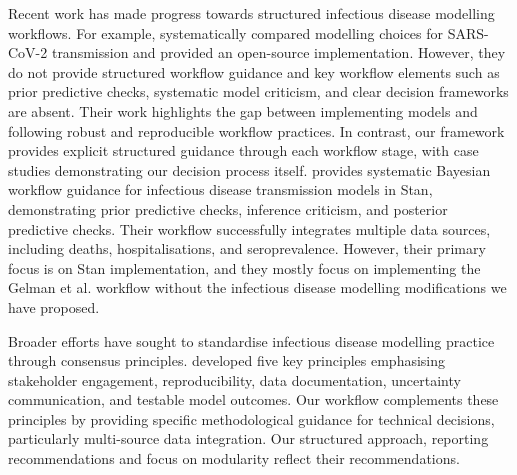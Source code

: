 \documentclass{article}
\begin{document}
Recent work has made progress towards structured infectious disease modelling workflows.
For example, \citet{bouman2024bayesian} systematically compared modelling choices for SARS-CoV-2 transmission and provided an open-source implementation.
However, they do not provide structured workflow guidance and key workflow elements such as prior predictive checks, systematic model criticism, and clear decision frameworks are absent.
Their work highlights the gap between implementing models and following robust and reproducible workflow practices.
In contrast, our framework provides explicit structured guidance through each workflow stage, with case studies demonstrating our decision process itself.
\citet{grinsztajn2021bayesian} provides systematic Bayesian workflow guidance for infectious disease transmission models in Stan, demonstrating prior predictive checks, inference criticism, and posterior predictive checks. 
Their workflow successfully integrates multiple data sources, including deaths, hospitalisations, and seroprevalence. 
However, their primary focus is on Stan implementation, and they mostly focus on implementing the Gelman et al. workflow without the infectious disease modelling modifications we have proposed.

Broader efforts have sought to standardise infectious disease modelling practice through consensus principles. \citet{Behrend2020-au} developed five key principles emphasising stakeholder engagement, reproducibility, data documentation, uncertainty communication, and testable model outcomes. 
Our workflow complements these principles by providing specific methodological guidance for technical decisions, particularly multi-source data integration.
Our structured approach, reporting recommendations and focus on modularity reflect their recommendations.

\end{document}

